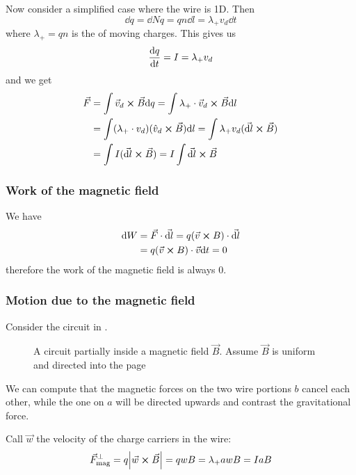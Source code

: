 \documentclass[12pt]{extarticle}
\begin{document}
Now consider a simplified case where the wire is 1D.
Then
\begin{equation}
	\dd q = \dd N q = q n \dd l = \lambda_+ v_d \dd t
\end{equation}
where $\lambda_+ = qn$ is the  of moving charges.
This gives us
\begin{equation}
	\dv{q}{t} = I = \lambda_+ v_d
\end{equation}
and we get
\begin{align}
	\vec F & = \int \vec v_d \cross \vec B \dd q
	= \int \lambda_+ \cdot \vec v_d \cross \vec B \dd l                  \\
	       & = \int (\lambda_+ \cdot v_d) (\hat v_d \cross \vec B) \dd l
	= \int \lambda_+ v_d (\vec{\dd l} \cross \vec B)                     \\
	       & = \int I (\vec {\dd l} \cross \vec B)
	= I \int \vec{\dd l} \cross \vec B
\end{align}

\subsubsection{Work of the magnetic field}

We have
\begin{align}
	\dd W & = \vec F \cdot \vec{\dd l}
	= q(\vec v \cross B) \cdot \vec{\dd l}          \\
	      & = q(\vec v \cross B) \cdot \vec v \dd t
	= 0
\end{align}
therefore the work of the magnetic field is always 0.

\subsubsection{Motion due to the magnetic field}

Consider the circuit in .

\begin{figure}[H]
	\centering
	
	\caption{A circuit partially inside a magnetic field $\vec B$.
		Assume $\vec B$ is uniform and directed into the page}
	\label{fig:work-magnetic}
\end{figure}

We can compute that the magnetic forces on the two wire portions $b$ cancel each other,
while the one on $a$ will be directed upwards and contrast the gravitational force.

Call $\vec w$ the velocity of the charge carriers in the wire:
\begin{equation}
	\vec F_\text{mag}^\perp = q \abs{\vec w \cross \vec B} = q w B = \lambda_+ a w B = I a B
\end{equation}
\end{document}
